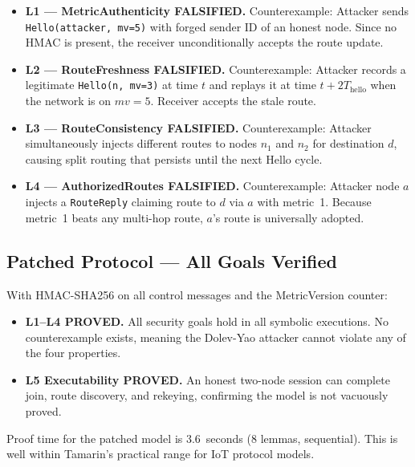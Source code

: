 \documentclass[journal]{IEEEtran}
\begin{document}
\begin{itemize}
  \item \textbf{L1 — MetricAuthenticity FALSIFIED.} Counterexample:
    Attacker sends \texttt{Hello(attacker, mv=5)} with forged sender
    ID of an honest node. Since no HMAC is present, the receiver
    unconditionally accepts the route update.

  \item \textbf{L2 — RouteFreshness FALSIFIED.} Counterexample:
    Attacker records a legitimate \texttt{Hello(n, mv=3)} at time $t$
    and replays it at time $t + 2T_{\text{hello}}$ when the network
    is on $mv=5$. Receiver accepts the stale route.

  \item \textbf{L3 — RouteConsistency FALSIFIED.} Counterexample:
    Attacker simultaneously injects different routes to nodes $n_1$
    and $n_2$ for destination $d$, causing split routing that
    persists until the next Hello cycle.

  \item \textbf{L4 — AuthorizedRoutes FALSIFIED.} Counterexample:
    Attacker node $a$ injects a \texttt{RouteReply} claiming route
    to $d$ via $a$ with metric~1. Because metric~1 beats any
    multi-hop route, $a$'s route is universally adopted.
\end{itemize}

\subsection{Patched Protocol — All Goals Verified}

With HMAC-SHA256 on all control messages and the MetricVersion counter:

\begin{itemize}
  \item \textbf{L1–L4 PROVED.} All security goals hold in all
    symbolic executions. No counterexample exists, meaning the Dolev-Yao
    attacker cannot violate any of the four properties.

  \item \textbf{L5 Executability PROVED.} An honest two-node session
    can complete join, route discovery, and rekeying, confirming the
    model is not vacuously proved.
\end{itemize}

Proof time for the patched model is 3.6~seconds (8 lemmas, sequential).
This is well within Tamarin's practical range for IoT protocol models.
\end{document}
